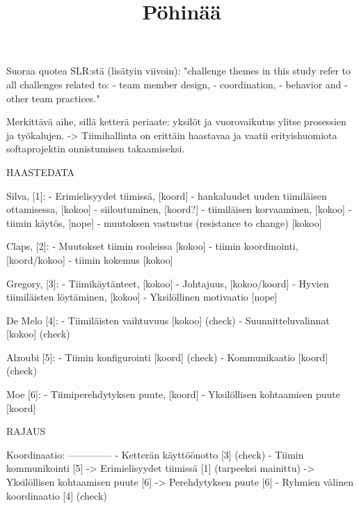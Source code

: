 \title{Pöhinää}

Suoraa quotea SLR:stä (lisätyin viivoin): 
"challenge themes in this study refer to all challenges related to:
- team member design, 
- coordination, 
- behavior and 
- other team practices."

Merkittävä aihe, sillä ketterä periaate: yksilöt ja vuorovaikutus ylitse prosessien ja työkalujen.
-> Tiimihallinta on erittäin haastavaa ja vaatii erityishuomiota softaprojektin onnistumisen takaamiseksi.

            HAASTEDATA

Silva,      [1]: 
- Erimielisyydet tiimissä,                      [koord]
- hankaluudet uuden tiimiläisen ottamisessa,    [kokoo]
- siiloutuminen,                                [koord?]
- tiimiläisen korvaaminen,                      [kokoo]
- tiimin käytös,                                [nope]
- muutoksen vastustus (resistance to change)    [kokoo]

Claps,      [2]:
- Muutokset tiimin rooleissa                    [kokoo]
- tiimin koordinointi,                          [koord/kokoo]
- tiimin kokemus                                [kokoo]

Gregory,    [3]:
- Tiimikäytänteet,                              [kokoo]
- Johtajuus,                                    [kokoo/koord]
- Hyvien tiimiläisten löytäminen,               [kokoo]
- Yksilöllinen motivaatio                       [nope]

De Melo     [4]:
- Tiimiläisten vaihtuvuus                       [kokoo] (check)
- Suunnitteluvalinnat                           [kokoo] (check)

Alzoubi     [5]:
- Tiimin konfigurointi                          [koord] (check)
- Kommunikaatio                                 [koord] (check)

Moe         [6]:
- Tiimiperehdytyksen puute,                     [koord]
- Yksilöllisen kohtaamisen puute                [koord]

    RAJAUS

Koordinaatio:
--------------
- Ketterän käyttöönotto                     [3] (check)
- Tiimin kommunikointi                      [5]
    -> Erimielisyydet tiimissä              [1] (tarpeeksi mainittu)
    -> Yksilöllisen kohtaamisen puute       [6]
    -> Perehdytyksen puute                  [6]
- Ryhmien välinen koordinaatio              [4] (check)

